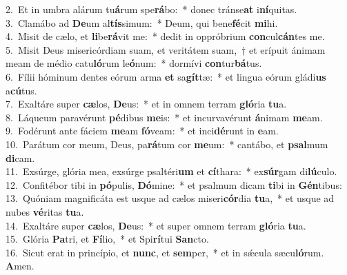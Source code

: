 {2.~}Et in umbra alárum tu\textbf{á}rum spe\textbf{rá}bo:~* donec tránse\textbf{at} i\textbf{ní}quitas.\\
{3.~}Clamábo ad \textbf{De}um al\textbf{tís}simum:~* Deum, qui bene\textbf{fé}cit \textbf{mi}hi.\\
{4.~}Misit de cælo, et \textbf{li}be\textbf{rá}vit me:~* dedit in oppróbrium \textbf{con}cul\textbf{cán}tes me.\\
{5.~}Misit Deus misericórdiam suam, et veritátem suam,~† et erípuit ánimam meam de médio catu\textbf{ló}rum le\textbf{ó}num:~* dormívi \textbf{con}tur\textbf{bá}tus.\\
{6.~}Fílii hóminum dentes eórum arma \textbf{et} sa\textbf{gít}tæ:~* et lingua eórum gládi\textbf{us} a\textbf{cú}tus.\\
{7.~}Exaltáre super \textbf{cæ}los, \textbf{De}us:~* et in omnem terram \textbf{gló}ria \textbf{tu}a.\\
{8.~}Láqueum paravérunt \textbf{pé}dibus \textbf{me}is:~* et incurvavérunt \textbf{á}nimam \textbf{me}am.\\
{9.~}Fodérunt ante fáciem \textbf{me}am \textbf{fó}veam:~* et inci\textbf{dé}runt in \textbf{e}am.\\
{10.~}Parátum cor meum, Deus, pa\textbf{rá}tum cor \textbf{me}um:~* cantábo, et \textbf{psal}mum \textbf{di}cam.\\
{11.~}Exsúrge, glória mea, exsúrge psaltéri\textbf{um} et \textbf{cí}thara:~* ex\textbf{súr}gam di\textbf{lú}culo.\\
{12.~}Confitébor tibi in \textbf{pó}pulis, \textbf{Dó}mine:~* et psalmum dicam \textbf{ti}bi in \textbf{Gén}tibus:\\
{13.~}Quóniam magnificáta est usque ad cælos miseri\textbf{cór}dia \textbf{tu}a,~* et usque ad nubes \textbf{vé}ritas \textbf{tu}a.\\
{14.~}Exaltáre super \textbf{cæ}los, \textbf{De}us:~* et super omnem terram \textbf{gló}ria \textbf{tu}a.\\
{15.~}Glória \textbf{Pa}tri, et \textbf{Fí}lio,~* et Spi\textbf{rí}tui \textbf{San}cto.\\
{16.~}Sicut erat in princípio, et \textbf{nunc}, et \textbf{sem}per,~* et in sǽcula sæcu\textbf{ló}rum. \textbf{A}men.\\
